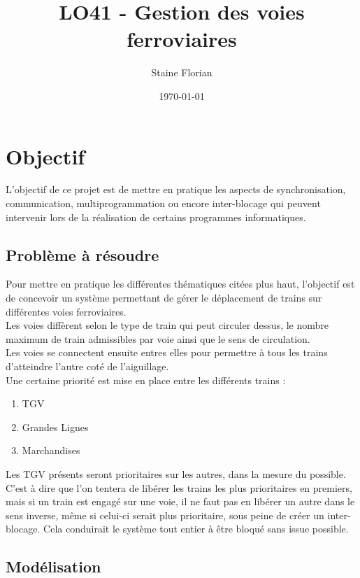 \documentclass[a4paper, 12pt]{report}
\title{LO41 - Gestion des voies ferroviaires}
\author{Staine Florian}
\date\today
\begin{document}
\maketitle

\chapter{Objectif}
L'objectif de ce projet est de mettre en pratique les aspects de synchronisation, communication, multiprogrammation ou encore inter-blocage qui peuvent intervenir 
lors de la réalisation de certains programmes informatiques.

\section{Problème à résoudre}
Pour mettre en pratique les différentes thématiques citées plus haut, 
l'objectif est de concevoir un système permettant de gérer le déplacement de trains 
sur différentes voies ferroviaires.\\
Les voies diffèrent selon le type de train qui peut circuler dessus, le nombre maximum de train admissibles par voie ainsi que le sens de circulation.\\
Les voies se connectent ensuite entres elles pour permettre à tous les trains d'atteindre l'autre coté de l'aiguillage. \\
Une certaine priorité est mise en place entre les différents trains :

\begin{enumerate}
\item TGV
\item Grandes Lignes
\item Marchandises\newline{}
\end{enumerate}

Les TGV présents seront prioritaires sur les autres, dans la mesure du possible.
C'est à dire que l'on tentera de libérer les trains les plus prioritaires en premiers, 
mais si un train est engagé sur une voie, il ne faut pas en libérer un autre 
dans le sens inverse, même si celui-ci serait plus prioritaire, 
sous peine de créer un inter-blocage.
Cela conduirait le système tout entier à être bloqué sans issue possible.

\section{Modélisation}
\end{document}
